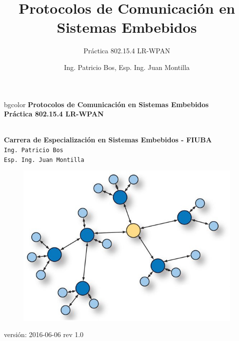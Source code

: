 \documentclass[aspectratio=169, handout]{beamer}
\title[802.15.4 LR-WPAN]{Protocolos de Comunicación en Sistemas Embebidos}
\subtitle{Práctica 802.15.4 LR-WPAN}
\author[]{Ing. Patricio Bos, Esp. Ing. Juan Montilla}
\institute[CESE-FIUBA]{Carrera de Especialización en Sistemas Embebidos - FIUBA}
\date{}
\begin{document}

%



\begingroup
\makeatletter
\setlength{\hoffset}{-.5\beamer@sidebarwidth}
\makeatother
\begin{frame}
\begin{center}
\hfill
    \begin{beamercolorbox}[center,dp=3ex,ht=10.25ex, wd=1\linewidth]{bgcolor}
        \Large\textbf{Protocolos de Comunicación en Sistemas Embebidos}\\
        \huge\textbf{Práctica 802.15.4 LR-WPAN}
    \end{beamercolorbox}
\hfill\hfill
\\
\vspace{5px}
\textbf{Carrera de Especialización en Sistemas Embebidos - FIUBA}\\
\vspace{10px}
\texttt{Ing. Patricio Bos}\\
\texttt{Esp. Ing. Juan Montilla}\\

\vspace{10px}

\begin{figure}[H]
	\includegraphics[width=.3\textwidth]{./imagenes/red.jpg}
\end{figure}	  	  	
\vspace{5px}
\tiny versión: 2016-06-06 rev 1.0 

\end{center}
\end{frame}
\endgroup
\end{document}
